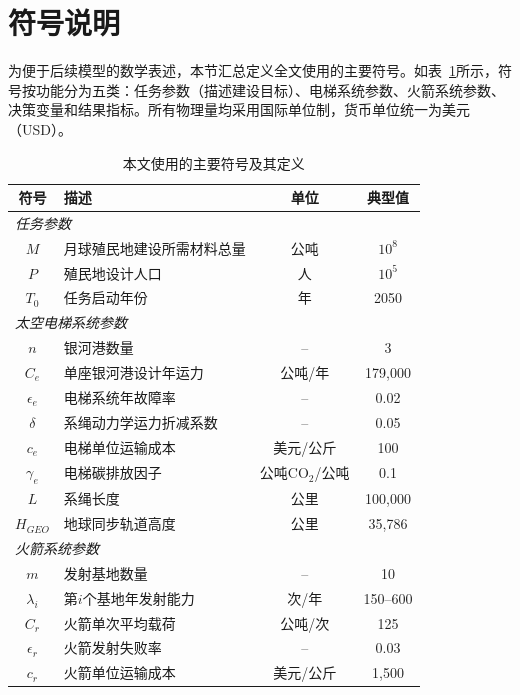 \section{符号说明}
\setlength{\parindent}{2em}

为便于后续模型的数学表述，本节汇总定义全文使用的主要符号。如表~\ref{tab:notations}所示，符号按功能分为五类：任务参数（描述建设目标）、电梯系统参数、火箭系统参数、决策变量和结果指标。所有物理量均采用国际单位制，货币单位统一为美元（USD）。

\begin{table}[htbp]
    \centering
    \caption{本文使用的主要符号及其定义}
    \label{tab:notations}
    \begin{tabular}{clcc}
        \toprule
        符号 & 描述 & 单位 & 典型值 \\
        \midrule
        \multicolumn{4}{l}{\textit{任务参数}} \\
        $M$ & 月球殖民地建设所需材料总量 & 公吨 & $10^8$ \\
        $P$ & 殖民地设计人口 & 人 & $10^5$ \\
        $T_0$ & 任务启动年份 & 年 & 2050 \\
        \midrule
        \multicolumn{4}{l}{\textit{太空电梯系统参数}} \\
        $n$ & 银河港数量 & -- & 3 \\
        $C_e$ & 单座银河港设计年运力 & 公吨/年 & 179,000 \\
        $\epsilon_e$ & 电梯系统年故障率 & -- & 0.02 \\
        $\delta$ & 系绳动力学运力折减系数 & -- & 0.05 \\
        $c_e$ & 电梯单位运输成本 & 美元/公斤 & 100 \\
        $\gamma_e$ & 电梯碳排放因子 & 公吨CO$_2$/公吨 & 0.1 \\
        $L$ & 系绳长度 & 公里 & 100,000 \\
        $H_{GEO}$ & 地球同步轨道高度 & 公里 & 35,786 \\
        \midrule
        \multicolumn{4}{l}{\textit{火箭系统参数}} \\
        $m$ & 发射基地数量 & -- & 10 \\
        $\lambda_i$ & 第$i$个基地年发射能力 & 次/年 & 150--600 \\
        $C_r$ & 火箭单次平均载荷 & 公吨/次 & 125 \\
        $\epsilon_r$ & 火箭发射失败率 & -- & 0.03 \\
        $c_r$ & 火箭单位运输成本 & 美元/公斤 & 1,500 \\

\end{tabular}
\end{table}
